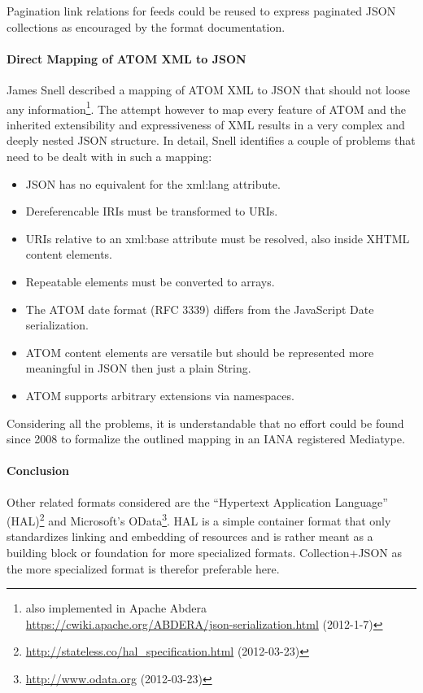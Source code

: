 \documentclass[12pt,a4paper,twoside]{scrartcl}		%
\newcommand{\citeurl}[2]{\url{#1} (#2)}
\begin{document}
Pagination link relations for feeds\cite{RFC5005} could be reused to express
paginated JSON collections as encouraged by the format
documentation\cite[sec. 5.5]{Amundsen2011a}.


\paragraph{Direct Mapping of ATOM XML to JSON}

James Snell described a mapping of ATOM XML to JSON that should not loose any
information\cite{Snell2008}\footnote{also implemented in Apache Abdera
  \citeurl{https://cwiki.apache.org/ABDERA/json-serialization.html}{2012-1-7}}. The
attempt however to map every feature of ATOM and the inherited extensibility and
expressiveness of XML results in a very complex and deeply nested JSON
structure. In detail, Snell identifies a couple of problems that need to be
dealt with in such a mapping\cite{Snell2008}:

\begin{itemize}
  \item JSON has no equivalent for the xml:lang attribute.
  \item Dereferencable IRIs must be transformed to URIs.
  \item URIs relative to an xml:base attribute must be resolved, also inside XHTML content elements.
  \item Repeatable elements must be converted to arrays.
  \item The ATOM date format (RFC 3339) differs from the JavaScript Date serialization.
  \item ATOM content elements are versatile but should be represented more meaningful in JSON then just a plain String.
  \item ATOM supports arbitrary extensions via namespaces.
\end{itemize}

Considering all the problems, it is understandable that no effort could be found
since 2008 to formalize the outlined mapping in an IANA registered Mediatype.

\paragraph{Conclusion}

Other related formats considered are the ``Hypertext Application Language''
(HAL)\footnote{\citeurl{http://stateless.co/hal_specification.html}{2012-03-23}}
and Microsoft's OData\footnote{\citeurl{http://www.odata.org}{2012-03-23}}. HAL
is a simple container format that only standardizes linking and embedding of
resources and is rather meant as a building block or foundation for more
specialized formats. Collection+JSON as the more specialized format is therefor
preferable here.
\end{document}
